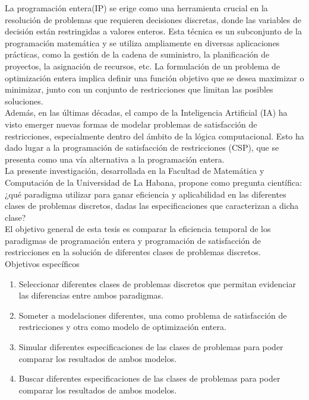 \documentclass[12pt]{report}
\begin{document}
La programación entera(IP) se erige como una herramienta crucial en la resolución de problemas que requieren decisiones discretas, donde las variables de decisión están restringidas a valores enteros. Esta técnica es un subconjunto de la programación matemática y se utiliza ampliamente en diversas aplicaciones prácticas, como la gestión de la cadena de suministro, la planificación de proyectos, la asignación de recursos, etc. La formulación de un problema de optimización entera implica definir una función objetivo que se desea maximizar o minimizar, junto con un conjunto de restricciones que limitan las posibles soluciones.  \\

Además, en las últimas décadas, el campo de la Inteligencia Artificial (IA) ha visto emerger nuevas formas de modelar problemas de satisfacción de restricciones, especialmente dentro del ámbito de la lógica computacional. Esto ha dado lugar a la programación de satisfacción de restricciones (CSP), que se presenta como una vía alternativa a la programación entera.  \\

La presente investigación, desarrollada en la Facultad de Matemática y Computación de la Universidad de La Habana, propone como pregunta científica: ¿qué paradigma utilizar para ganar eficiencia y aplicabilidad en las diferentes clases de problemas discretos, dadas las especificaciones que caracterizan a dicha clase?  \\

El objetivo general de esta tesis es comparar la eficiencia temporal de los paradigmas de programación entera y programación de satisfacción de restricciones en la solución de diferentes clases de problemas discretos. \\


Objetivos específicos
\begin{enumerate}
\item Seleccionar diferentes clases de problemas discretos que permitan evidenciar las diferencias entre ambos paradigmas.
\item Someter a modelaciones diferentes, una como problema de satisfacción de restricciones y otra como modelo de optimización entera.
\item Simular diferentes especificaciones de las clases de problemas para poder comparar los resultados de ambos modelos.
\item Buscar diferentes especificaciones de las clases de problemas para poder comparar los resultados de ambos modelos.\\
\end{enumerate}
\end{document}
